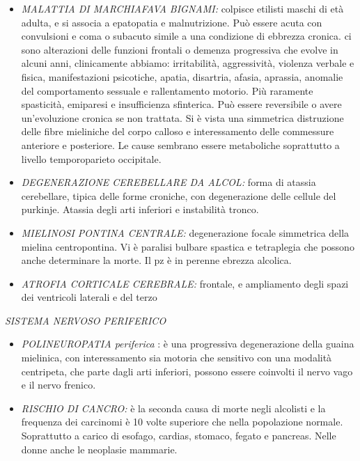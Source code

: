 \begin{itemize}
\item \emph{MALATTIA DI MARCHIAFAVA BIGNAMI:} colpisce etilisti maschi di età adulta, e si associa a epatopatia e malnutrizione. Può essere acuta con convulsioni e coma o subacuto simile a una condizione di ebbrezza cronica. ci sono alterazioni delle funzioni frontali o demenza progressiva che evolve in alcuni anni, clinicamente abbiamo: irritabilità, aggressività, violenza verbale e fisica, manifestazioni psicotiche, apatia, disartria, afasia, aprassia, anomalie del comportamento sessuale e rallentamento motorio. Più raramente spasticità, emiparesi e insufficienza sfinterica. Può essere reversibile o avere un'evoluzione cronica se non trattata. Si è vista una simmetrica distruzione delle fibre mieliniche del corpo calloso e interessamento delle commessure anteriore e posteriore. Le cause sembrano essere metaboliche soprattutto a livello temporoparieto occipitale.

\item \emph{DEGENERAZIONE CEREBELLARE DA ALCOL:} forma di atassia cerebellare,
tipica delle forme croniche, con degenerazione delle cellule del
purkinje. Atassia degli arti inferiori e instabilità tronco.

\item \emph{MIELINOSI PONTINA CENTRALE:} degenerazione focale simmetrica della mielina centropontina. Vi è paralisi bulbare spastica e tetraplegia che possono anche determinare la morte. Il pz è in perenne ebrezza alcolica.

\item \emph{ATROFIA CORTICALE CEREBRALE:} frontale, e ampliamento degli spazi dei ventricoli laterali e del terzo
\end{itemize}

\emph{SISTEMA NERVOSO PERIFERICO}
\begin{itemize}
\item
\emph{POLINEUROPATIA periferica} : è una progressiva degenerazione della
guaina mielinica, con interessamento sia motoria che sensitivo con una
modalità centripeta, che parte dagli arti inferiori, possono essere
coinvolti il nervo vago e il nervo frenico.
\item
\emph{RISCHIO DI CANCRO:} è la seconda causa di morte negli alcolisti e
la frequenza dei carcinomi è 10 volte superiore che nella popolazione
normale. Soprattutto a carico di esofago, cardias, stomaco, fegato e
pancreas. Nelle donne anche le neoplasie mammarie.
\end{itemize}

